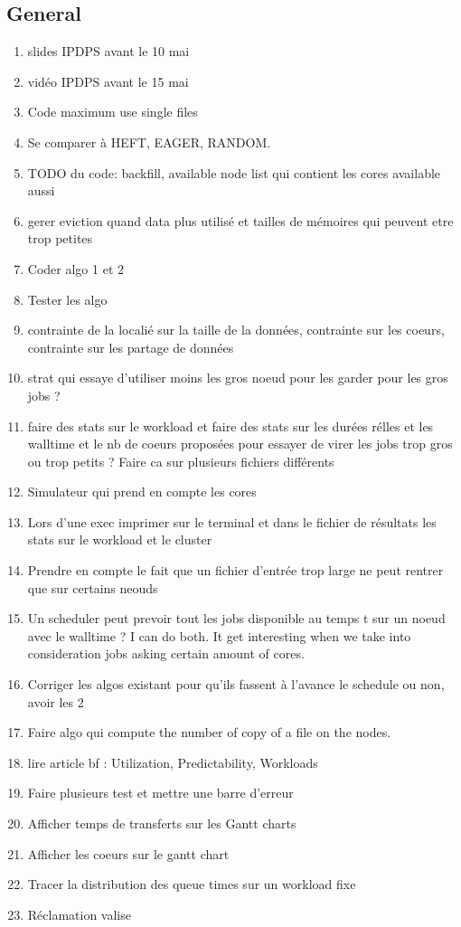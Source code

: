 \documentclass[a4paper]{article}
\begin{document}
	\subsection{General}
		\begin{enumerate}
			\item slides IPDPS avant le 10 mai
			\item vidéo IPDPS avant le 15 mai
			\item Code maximum use single files
			\item Se comparer à HEFT, EAGER, RANDOM.
			\item TODO du code: backfill, available node list qui contient les cores available aussi
			\item gerer eviction quand data plus utilisé et tailles de mémoires qui peuvent etre trop petites
			\item Coder algo 1 et 2
			\item Tester les algo
			\item contrainte de la localié sur la taille de la données, contrainte sur les coeurs, contrainte sur les partage de données
			\item strat qui essaye d'utiliser moins les gros noeud pour les garder pour les gros jobs ?
			\item faire des stats sur le workload et faire des stats sur les durées rélles et les walltime et le nb de coeurs proposées pour essayer de virer les jobs trop gros ou trop petits ? Faire ca sur plusieurs fichiers différents
			\item Simulateur qui prend en compte les cores
			\item Lors d'une exec imprimer sur le terminal et dans le fichier de résultats les stats sur le workload et le cluster
			\item Prendre en compte le fait que un fichier d'entrée trop large ne peut rentrer que sur certains neouds
			\item Un scheduler peut prevoir tout les jobs disponible au temps t sur un noeud avec le walltime ? I can do both. It get interesting when we take into consideration jobs asking certain amount of cores. 
			\item Corriger les algos existant pour qu'ils fassent à l'avance le schedule ou non, avoir les 2
			\item Faire algo qui compute the number of copy of a file on the nodes.
			\item lire article bf : Utilization, Predictability, Workloads
			\item Faire plusieurs test et mettre une barre d'erreur
			\item Afficher temps de transferts sur les Gantt charts
			\item Afficher les coeurs sur le gantt chart
			\item Tracer la distribution des queue times sur un workload fixe
			\item Réclamation valise
		\end{enumerate}
\end{document}
